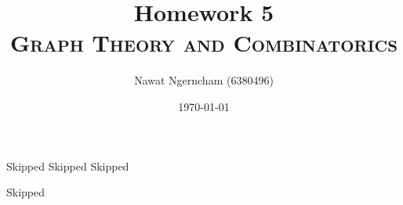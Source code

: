 \documentclass[answers]{exam}
\title{\Huge{Homework 5}
	\\
\Large\scshape{Graph Theory and Combinatorics}}
\author{Nawat Ngerncham (6380496)}
\date{\today}
\begin{document}
\maketitle

\begin{questions}
  \question Skipped
  \question Skipped
  \question Skipped
  
  \question Skipped
  
\end{questions}

% 
% 
\end{document}
